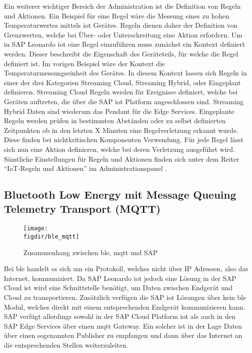 \noindent Ein weiterer wichtiger Bereich der Administration ist die Definition von Regeln und Aktionen. Ein Beispiel für eine Regel wäre die Messung eines zu hohen Temperaturwertes mittels \ac{iot} Gerätes. Regeln dienen daher der Definition von Grenzwerten, welche bei Über- oder Unterschreitung eine Aktion erfordern. Um in SAP Leonardo \ac{iot} eine Regel einzuführen muss zunächst ein Kontext definiert werden. Dieser beschreibt die Eigenschaft des Geräteteils, für welche die Regel definiert ist. Im vorigen Beispiel wäre der Kontext die Temperaturmessungseinheit des Gerätes. In diesem Kontext lassen sich Regeln in einer der drei Kategorien Streaming Cloud, Streaming Hybrid, oder Eingeplant definieren. Streaming Cloud Regeln werden für Ereignisse definiert, welche bei Geräten auftreten, die über die SAP \ac{iot} Platform angeschlossen sind. Streaming Hybrid Daten sind wiederum das Pendant für die Edge Services. Eingeplante Regeln werden prüfen in bestimmten Abständen oder zu selbst definierten Zeitpunkten ob in den letzten X Minuten eine Regelverletzung erkannt wurde. Diese finden bei nichtkritischen Komponenten Verwendung. Für jede Regel lässt sich nun eine Aktion definieren, welche bei deren Verletzung ausgeführt wird. Sämtliche Einstellungen für Regeln und Aktionen finden sich unter dem Reiter "`IoT-Regeln und Aktionen"' im Administrationspanel \cite[Seite 224ff]{Holtschulte20:IOS}.\\   

\subsection{Bluetooth Low Energy mit Message Queuing Telemetry Transport (MQTT)}
\label{ss:interface:ble}

\begin{figure}[!b]
	\centering
	\texttt{[image: \\figdir/ble\_mqtt]}
	\caption{Zusammenhang zwischen \ac{ble}, \ac{mqtt} und SAP \cite[Seite 3f]{Zivkovic20:MQTT} \cite[Seite 230f]{Holtschulte20:IOS}}
	\label{FIG:mqtt}
\end{figure}

\noindent Bei \ac{ble} handelt es sich um ein Protokoll, welches nicht über IP Adressen, also das Internet, kommuniziert. Da SAP Leonardo \ac{iot} jedoch eine Lösung in der SAP Cloud ist wird eine Schnittstelle benötigt, um Daten zwischen Endgerät und Cloud zu transportieren. Zusätzlich verfügen die SAP \ac{iot} Lösungen über kein \ac{ble} Modul, welches direkt mit einem entsprechenden Endgerät kommunizieren kann. SAP verfügt allerdings sowohl in der SAP Cloud Platform \ac{iot} als auch in den SAP Edge Services über einen \ac{mqtt} Gateway. Ein solcher ist in der Lage Daten über einen sogenannten Publisher zu empfangen und dann über das Internet an die entsprechenden Stellen weiterzuleiten.\\

